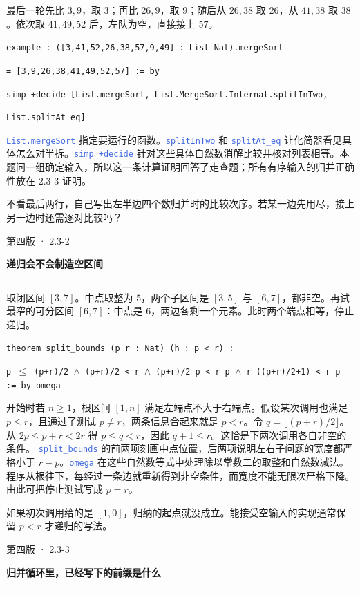 \documentclass[UTF8,11pt,a4paper,fontset=fandol]{ctexart}
\newcommand{\HandoutLesson}[2]{%
  \par{\small\heiti\color{BrickRed}#1}\par\vspace{3pt}
  {\fontsize{21}{27}\selectfont\heiti\bfseries #2}\par
  \textcolor{BrickRed}{\rule{\linewidth}{.7pt}}\par}
\newcommand{\HandoutBox}[1]{%
  \par\noindent\begingroup\setlength{\fboxsep}{8pt}%
  \colorbox{BrickRed!9}{\parbox{\dimexpr\linewidth-16pt\relax}{#1}}\endgroup\par}
\newcommand{\src}[1]{\textcolor{RoyalBlue}{\texttt{#1}}}
\newcommand{\subhead}[1]{\par\vspace{3pt}{\heiti\bfseries\color{RoyalBlue}#1}\par}
\newenvironment{leanblock}{\par\smallskip\noindent\begin{lrbox}{\leanbox}\begin{minipage}{\dimexpr\linewidth-12pt\relax}\raggedright\small\setlength{\parskip}{0pt}}{\end{minipage}\end{lrbox}\colorbox{RoyalBlue!6}{\usebox{\leanbox}}\par\smallskip}
\newcommand{\lineofcode}[2]{\noindent\hspace*{#1em}\strut\texttt{#2}\par}
\begin{document}
最后一轮先比 $3,9$，取 $3$；再比 $26,9$，取 $9$；随后从 $26,38$ 取 $26$，从 $41,38$ 取 $38$。依次取 $41,49,52$ 后，左队为空，直接接上 $57$。
\subhead{用可核对的等式记录答案}
\begin{leanblock}
\lineofcode{0.0}{example : ([3,41,52,26,38,57,9,49] : List Nat).mergeSort}
\lineofcode{1.8}{= [3,9,26,38,41,49,52,57] := by}
\lineofcode{0.9}{simp +decide [List.mergeSort, List.MergeSort.Internal.splitInTwo,}
\lineofcode{1.8}{List.splitAt\_eq]}
\end{leanblock}
\src{List.mergeSort} 指定要运行的函数。\src{splitInTwo} 和 \src{splitAt\_eq} 让化简器看见具体怎么对半拆。\src{simp +decide} 针对这些具体自然数消解比较并核对列表相等。本题问一组确定输入，所以这一条计算证明回答了走查题；所有有序输入的归并正确性放在 2.3-3 证明。
\HandoutBox{不看最后两行，自己写出左半边四个数归并时的比较次序。若某一边先用尽，接上另一边时还需逐对比较吗？}
\par{}
\clearpage{}\label{p31}\HandoutLesson{第四版 · 2.3-2}{递归会不会制造空区间}
取闭区间 $[3,7]$。中点取整为 $5$，两个子区间是 $[3,5]$ 与 $[6,7]$，都非空。再试最窄的可分区间 $[6,7]$：中点是 $6$，两边各剩一个元素。此时两个端点相等，停止递归。
\begin{leanblock}
\lineofcode{0.0}{theorem split\_bounds (p r : Nat) (h : p < r) :}
\lineofcode{1.8}{p \ensuremath{\leq} (p+r)/2 \ensuremath{\wedge} (p+r)/2 < r \ensuremath{\wedge} (p+r)/2-p < r-p \ensuremath{\wedge} r-((p+r)/2+1) < r-p := by omega}
\end{leanblock}
开始时若 $n\ge1$，根区间 $[1,n]$ 满足左端点不大于右端点。假设某次调用也满足 $p\le r$，且通过了测试 $p\ne r$，两条信息合起来就是 $p<r$。令 $q=\lfloor(p+r)/2\rfloor$。从 $2p\le p+r<2r$ 得 $p\le q<r$，因此 $q+1\le r$。这恰是下两次调用各自非空的条件。
\src{split\_bounds} 的前两项刻画中点位置，后两项说明左右子问题的宽度都严格小于 $r-p$。\src{omega} 在这些自然数等式中处理除以常数二的取整和自然数减法。程序从根往下，每经过一条边就重新得到非空条件，而宽度不能无限次严格下降。由此可把停止测试写成 $p=r$。
\HandoutBox{如果初次调用给的是 $[1,0]$，归纳的起点就没成立。能接受空输入的实现通常保留 $p<r$ 才递归的写法。}
\par{}
\clearpage{}\label{p32}\HandoutLesson{第四版 · 2.3-3}{归并循环里，已经写下的前缀是什么}
\end{document}
